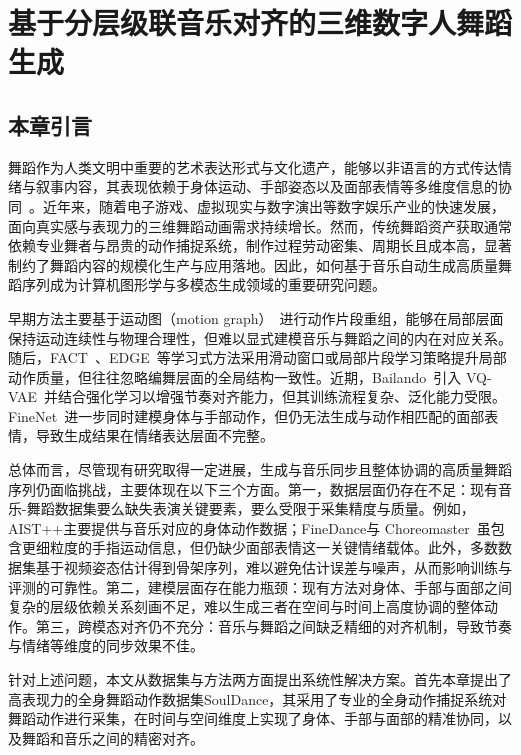 \chapter{基于分层级联音乐对齐的三维数字人舞蹈生成}
\section{本章引言}
舞蹈作为人类文明中重要的艺术表达形式与文化遗产，能够以非语言的方式传达情绪与叙事内容，其表现依赖于身体运动、手部姿态以及面部表情等多维度信息的协同~\cite{fink2021evolution, kico2018digitization}。近年来，随着电子游戏、虚拟现实与数字演出等数字娱乐产业的快速发展，面向真实感与表现力的三维舞蹈动画需求持续增长。然而，传统舞蹈资产获取通常依赖专业舞者与昂贵的动作捕捉系统，制作过程劳动密集、周期长且成本高，显著制约了舞蹈内容的规模化生产与应用落地。因此，如何基于音乐自动生成高质量舞蹈序列成为计算机图形学与多模态生成领域的重要研究问题。

早期方法主要基于运动图（motion graph）~\cite{arikan2002interactive, kim2003rhythmic, shiratori2006dancing, kim2006making, tang2018dance}进行动作片段重组，能够在局部层面保持运动连续性与物理合理性，但难以显式建模音乐与舞蹈之间的内在对应关系。随后，FACT~\cite{li2021ai}、EDGE~\cite{tseng2023edge}等学习式方法采用滑动窗口或局部片段学习策略提升局部动作质量，但往往忽略编舞层面的全局结构一致性。近期，Bailando~\cite{siyao2022bailando}引入 VQ-VAE~\cite{van2017neural}并结合强化学习以增强节奏对齐能力，但其训练流程复杂、泛化能力受限。FineNet~\cite{li2023finedance}进一步同时建模身体与手部动作，但仍无法生成与动作相匹配的面部表情，导致生成结果在情绪表达层面不完整。

总体而言，尽管现有研究取得一定进展，生成与音乐同步且整体协调的高质量舞蹈序列仍面临挑战，主要体现在以下三个方面。第一，数据层面仍存在不足：现有音乐-舞蹈数据集要么缺失表演关键要素，要么受限于采集精度与质量。例如，AIST++\cite{li2021ai}主要提供与音乐对应的身体动作数据；FineDance\cite{li2023finedance}与 Choreomaster~\cite{chen2021choreomaster}虽包含更细粒度的手指运动信息，但仍缺少面部表情这一关键情绪载体。此外，多数数据集基于视频姿态估计得到骨架序列，难以避免估计误差与噪声，从而影响训练与评测的可靠性。第二，建模层面存在能力瓶颈：现有方法对身体、手部与面部之间复杂的层级依赖关系刻画不足，难以生成三者在空间与时间上高度协调的整体动作。第三，跨模态对齐仍不充分：音乐与舞蹈之间缺乏精细的对齐机制，导致节奏与情绪等维度的同步效果不佳。

针对上述问题，本文从数据集与方法两方面提出系统性解决方案。首先本章提出了高表现力的全身舞蹈动作数据集SoulDance，其采用了专业的全身动作捕捉系统对舞蹈动作进行采集，在时间与空间维度上实现了身体、手部与面部的精准协同，以及舞蹈和音乐之间的精密对齐。

